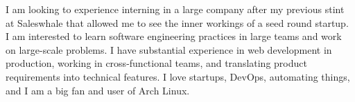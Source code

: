 

\begin{cvparagraph}

  I am looking to experience interning in a large company after my previous stint at Saleswhale that allowed me to see the inner workings of a seed round startup. I am interested to learn software engineering practices in large teams and work on large-scale problems. I have substantial experience in web development in production, working in cross-functional teams, and translating product requirements into technical features. I love startups, DevOps, automating things, and I am a big fan and user of Arch Linux.
\end{cvparagraph}
